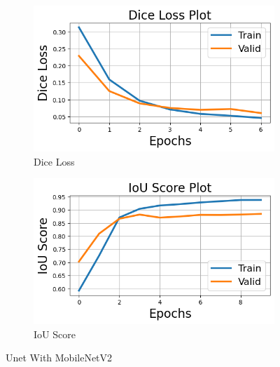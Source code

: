 \documentclass[12pt]{article}
\begin{document}
\begin{figure}[H]
  \begin{subfigure}[b]{0.5\textwidth}
    \includegraphics[width=\textwidth]{Figs/unetwithmbnetdice.png}
    \caption{Dice Loss}
    \label{fig:f1}
  \end{subfigure}
  \hfill
  \begin{subfigure}[b]{0.5\textwidth}
    \includegraphics[width=\textwidth]{Figs/unetwithmbnetiou.png}
    \caption{IoU Score}
    \label{fig:f2}
  \end{subfigure}
  \caption{Unet With MobileNetV2}
\end{figure}
\end{document}
